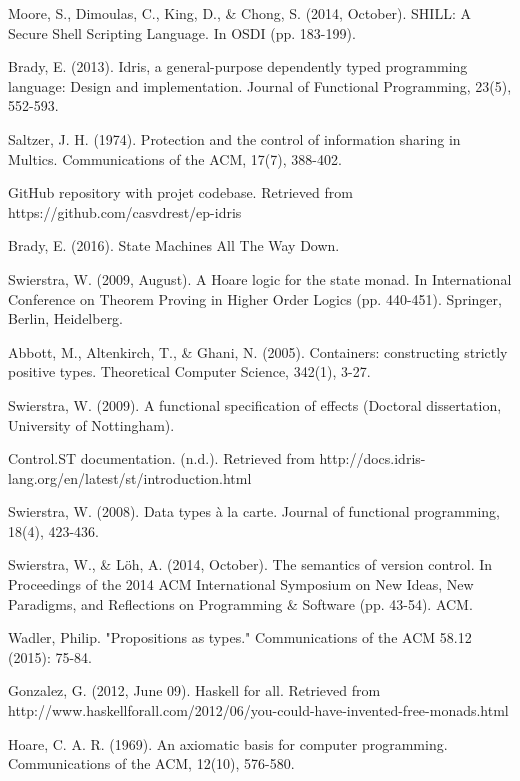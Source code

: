 \documentclass[12pt,a4paper]{article}
\begin{document}
\begin{thebibliography}{99}
Moore, S., Dimoulas, C., King, D., \& Chong, S. (2014, October). SHILL: A Secure Shell Scripting Language. In OSDI (pp. 183-199).

Brady, E. (2013). Idris, a general-purpose dependently typed programming language: Design and implementation. Journal of Functional Programming, 23(5), 552-593.

Saltzer, J. H. (1974). Protection and the control of information sharing in Multics. Communications of the ACM, 17(7), 388-402.

GitHub repository with projet codebase. Retrieved from https://github.com/casvdrest/ep-idris

Brady, E. (2016). State Machines All The Way Down.

Swierstra, W. (2009, August). A Hoare logic for the state monad. In International Conference on Theorem Proving in Higher Order Logics (pp. 440-451). Springer, Berlin, Heidelberg.

Abbott, M., Altenkirch, T., \& Ghani, N. (2005). Containers: constructing strictly positive types. Theoretical Computer Science, 342(1), 3-27.

Swierstra, W. (2009). A functional specification of effects (Doctoral dissertation, University of Nottingham).

Control.ST documentation. (n.d.). Retrieved from http://docs.idris-lang.org/en/latest/st/introduction.html

Swierstra, W. (2008). Data types à la carte. Journal of functional programming, 18(4), 423-436.

Swierstra, W., \& Löh, A. (2014, October). The semantics of version control. In Proceedings of the 2014 ACM International Symposium on New Ideas, New Paradigms, and Reflections on Programming \& Software (pp. 43-54). ACM.

Wadler, Philip. "Propositions as types." Communications of the ACM 58.12 (2015): 75-84.

Gonzalez, G. (2012, June 09). Haskell for all. Retrieved from http://www.haskellforall.com/2012/06/you-could-have-invented-free-monads.html

Hoare, C. A. R. (1969). An axiomatic basis for computer programming. Communications of the ACM, 12(10), 576-580.

\end{thebibliography}
\end{document}
